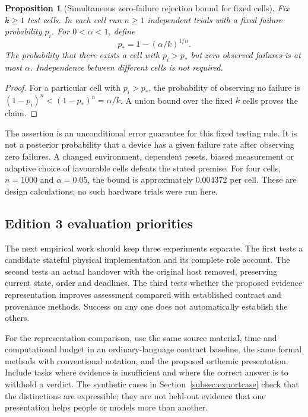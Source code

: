 \documentclass[11pt,a4paper]{article}
\newtheorem{proposition}[theorem]{Proposition}
\theoremstyle{definition}
\theoremstyle{remark}
\begin{document}
\begin{proposition}[Simultaneous zero-failure rejection bound for fixed cells]\label{prop:zerofailure}
Fix $k\geq1$ test cells. In each cell run $n\geq1$ independent trials with a fixed failure probability $p_i$. For $0<\alpha<1$, define
\[
 p_*=1-(\alpha/k)^{1/n}.
\]
The probability that there exists a cell with $p_i>p_*$ but zero observed failures is at most $\alpha$. Independence between different cells is not required.
\end{proposition}
\begin{proof}
For a particular cell with $p_i>p_*$, the probability of observing no failure is $(1-p_i)^n<(1-p_*)^n=\alpha/k$. A union bound over the fixed $k$ cells proves the claim.
\end{proof}
The assertion is an unconditional error guarantee for this fixed testing rule. It is not a posterior probability that a device has a given failure rate after observing zero failures. A changed environment, dependent resets, biased measurement or adaptive choice of favourable cells defeats the stated premise. For four cells, $n=1000$ and $\alpha=0.05$, the bound is approximately $0.004372$ per cell. These are design calculations; no such hardware trials were run here.

\subsection{Edition 3 evaluation priorities}
The next empirical work should keep three experiments separate. The first tests a candidate stateful physical implementation and its complete role account. The second tests an actual handover with the original host removed, preserving current state, order and deadlines. The third tests whether the proposed evidence representation improves assessment compared with established contract and provenance methods. Success on any one does not automatically establish the others.

For the representation comparison, use the same source material, time and computational budget in an ordinary-language contract baseline, the same formal methods with conventional notation, and the proposed orthemic presentation. Include tasks where evidence is insufficient and where the correct answer is to withhold a verdict. The synthetic cases in Section~\ref{subsec:exportcase} check that the distinctions are expressible; they are not held-out evidence that one presentation helps people or models more than another.
\end{document}
